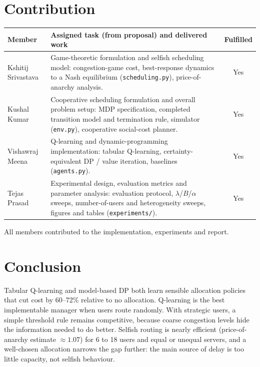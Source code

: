 \documentclass{article}
\begin{document}
\section{Contribution}
\begin{center}\small
\begin{tabular}{@{}p{2.7cm}p{11.4cm}c@{}}
\toprule
Member & Assigned task (from proposal) and delivered work & Fulfilled\\
\midrule
Kshitij Srivastava & Game-theoretic formulation and selfish scheduling model: congestion-game
cost, best-response dynamics to a Nash equilibrium (\texttt{scheduling.py}), price-of-anarchy
analysis. & Yes\\
Kushal Kumar & Cooperative scheduling formulation and overall problem setup: MDP
specification, completed transition model and termination rule, simulator
(\texttt{env.py}), cooperative social-cost planner. & Yes\\
Vishawraj Meena & Q-learning and dynamic-programming implementation: tabular Q-learning,
certainty-equivalent DP / value iteration, baselines (\texttt{agents.py}). & Yes\\
Tejas Prasad & Experimental design, evaluation metrics and parameter analysis: evaluation
protocol, $\lambda$/$B$/$\alpha$ sweeps, number-of-users and heterogeneity sweeps, figures
and tables (\texttt{experiments/}). & Yes\\
\bottomrule
\end{tabular}
\end{center}
\vspace{-0.6em}
\noindent All members contributed to the implementation, experiments and report.

\section{Conclusion}
Tabular Q-learning and model-based DP both learn sensible allocation policies that cut
cost by 60--72\% relative to no allocation. Q-learning is the best implementable manager
when users route randomly. With strategic users, a simple threshold rule remains
competitive, because coarse congestion levels hide the information needed to do
better. Selfish routing is nearly efficient (price-of-anarchy estimate $\approx1.07$) for 6 to 18
users and equal or unequal servers, and a well-chosen allocation narrows the gap further:
the main source of delay is too little capacity, not selfish behaviour.
\end{document}
